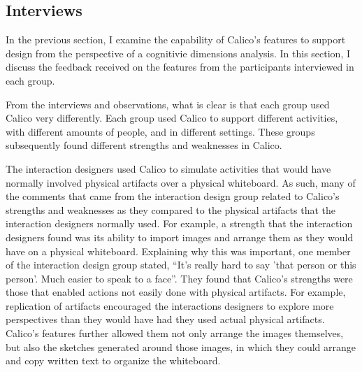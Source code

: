 \documentclass[12pt,fleqn]{ucithesis}
\begin{document}
\subsection{Interviews}
%

In the previous section, I examine the capability of Calico's features to support design from the perspective of a cognitivie dimensions analysis. In this section, I discuss the feedback received on the features from the participants interviewed in each group.

From the interviews and observations, what is clear is that each group used Calico very differently. Each group used Calico to support different activities, with different amounts of people, and in different settings. These groups subsequently found different strengths and weaknesses in Calico.

The interaction designers used Calico to simulate activities that would have normally involved physical artifacts over a physical whiteboard. As such, many of the comments that came from the interaction design group related to Calico's strengths and weaknesses as they compared to the physical artifacts that the interaction designers normally used. For example, a strength that the interaction designers found was its ability to import images and arrange them as they would have on a physical whiteboard. Explaining why this was important, one member of the interaction design group stated, ``It's really hard to say 'that person or this person'. Much easier to speak to a face''. They found that Calico's strengths were those that enabled actions not easily done with physical artifacts. For example, replication of artifacts encouraged the interactions designers to explore more perspectives than they would have had they used actual physical artifacts. Calico's features further allowed them not only arrange the images themselves, but also the sketches generated around those images, in which they could arrange and copy written text to organize the whiteboard. 
\end{document}
